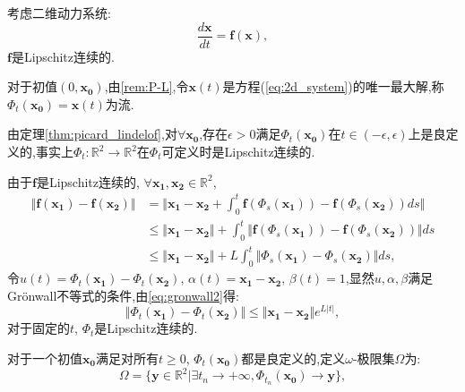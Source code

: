 考虑二维动力系统:
\begin{equation}\label{eq:2d_system}
    \frac{d\mathbf{x}}{dt}=\mathbf{f}(\mathbf{x}),
\end{equation}
$\mathbf{f}$是Lipschitz连续的. 
\begin{defn}[流]
    对于初值$(0,\mathbf{x_0})$,由\ref{rem:P-L},令$\mathbf{x}(t)$是方程(\ref{eq:2d_system})的唯一最大解,称$\Phi_t(\mathbf{x_0})=\mathbf{x}(t)$为流. 
\end{defn}
\begin{rem}
    由定理\ref{thm:picard_lindelof},对$\forall \mathbf{x_0}$,存在$\epsilon>0$满足$\Phi_t(\mathbf{x_0})$在$t\in (-\epsilon,\epsilon)$上是良定义的,事实上$\Phi_t:\mathbb{R}^2\to\mathbb{R}^2$在$\Phi_t$可定义时是Lipschitz连续的. 
\end{rem}
\begin{pf}
    由于$\mathbf{f}$是Lipschitz连续的, $\forall \mathbf{x_1},\mathbf{x_2}\in \mathbb{R}^2$,
    \begin{equation}
        \begin{aligned}
            \Vert \mathbf{f}(\mathbf{x_1})-\mathbf{f}(\mathbf{x_2})\Vert & = \Vert \mathbf{x_1}-\mathbf{x_2}+\int_0^t\mathbf{f}(\Phi_s(\mathbf{x_1}))-\mathbf{f}(\Phi_s(\mathbf{x_2}))ds\Vert \\
            &\leq \Vert \mathbf{x_1}-\mathbf{x_2}\Vert+\int_0^t\Vert \mathbf{f}(\Phi_s(\mathbf{x_1}))-\mathbf{f}(\Phi_s(\mathbf{x_2}))\Vert ds\\
            &\leq \Vert \mathbf{x_1}-\mathbf{x_2}\Vert+L\int_0^t\Vert \Phi_s(\mathbf{x_1})-\Phi_s(\mathbf{x_2})\Vert ds,
        \end{aligned}
    \end{equation}
    令$u(t)=\Phi_t(\mathbf{x_1})-\Phi_t(\mathbf{x_2})$, $\alpha(t)= \mathbf{x_1}-\mathbf{x_2}$, $\beta(t)=1$,显然$u,\alpha,\beta$满足Grönwall不等式的条件,由\ref{eq:gronwall2}得:
    \begin{equation}
        \Vert \Phi_t(\mathbf{x_1})-\Phi_t(\mathbf{x_2})\Vert\leq \Vert \mathbf{x_1}-\mathbf{x_2}\Vert e^{L|t|},
    \end{equation}
    对于固定的$t$, $\Phi_t$是Lipschitz连续的. 
\end{pf}
\begin{defn}\cite{coddington1956theory}

    对于一个初值$\mathbf{x_0}$满足对所有$t\geq 0$, $\Phi_t(\mathbf{x_0})$都是良定义的,定义$\omega$-极限集$\Omega$为:
    \begin{equation}
        \Omega=\{\mathbf{y}\in \mathbb{R}^2|\exists t_n\to +\infty,\Phi_{t_n}(\mathbf{x_0})\to \mathbf{y}\},
    \end{equation}
\end{defn}
